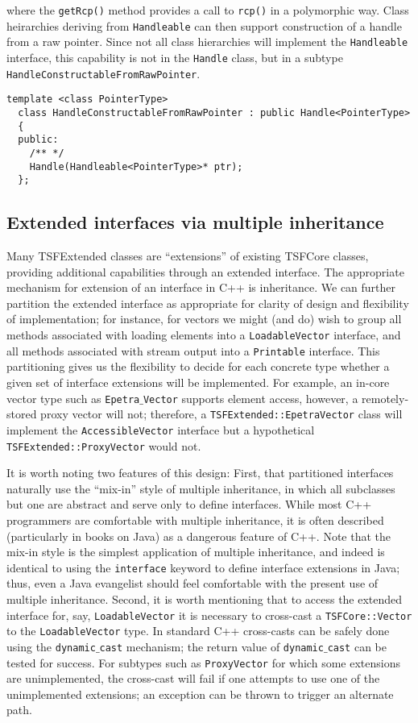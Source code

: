 where the {\tt getRcp()} method provides a call to {\tt rcp()} in 
a polymorphic way. Class heirarchies deriving from {\tt Handleable}
can then support construction of a handle from a raw pointer. Since
not all class hierarchies will implement the {\tt Handleable} interface,
this capability is not in the {\tt Handle} class, but in a subtype
{\tt HandleConstructableFromRawPointer}.
{\scriptsize\begin{verbatim}
template <class PointerType>
  class HandleConstructableFromRawPointer : public Handle<PointerType>
  {
  public:
    /** */
    Handle(Handleable<PointerType>* ptr);
  };
\end{verbatim}}


\subsection{Extended interfaces via multiple inheritance}

Many TSFExtended classes are ``extensions'' of existing TSFCore classes,
providing additional capabilities through an extended interface. 
The appropriate mechanism for extension of an interface in C++ is inheritance.
We can further partition the extended interface as appropriate for clarity
of design and flexibility of implementation; 
for instance, for vectors we might (and do) 
wish to group all methods associated with loading elements into 
a {\tt LoadableVector} interface, and all methods associated with
stream output into a {\tt Printable} interface. This partitioning gives
us the flexibility to decide for each concrete type whether a given
set of interface extensions will be implemented. For example, an in-core
vector type such as {\tt Epetra$\_$Vector} supports element access, however, 
a remotely-stored proxy vector will not; therefore, a 
{\tt TSFExtended::EpetraVector} class will implement the {\tt AccessibleVector}
interface but a hypothetical {\tt TSFExtended::ProxyVector} would not.

It is worth noting two features of this design: First, 
that partitioned interfaces naturally use the ``mix-in'' style 
of multiple inheritance, in which all subclasses but one are abstract and
serve only to define interfaces. While most C++ programmers are 
comfortable with multiple inheritance, it is often described (particularly
in books on Java) as a dangerous feature of C++. Note that the mix-in style
is the simplest application of multiple inheritance, and indeed is identical
to using the {\tt interface} keyword to define interface extensions
in Java; thus, even a Java evangelist should feel comfortable with the present
use of multiple inheritance.
Second, it is worth mentioning that to access the extended interface for, 
say, {\tt LoadableVector} it is necessary to cross-cast 
a {\tt TSFCore::Vector} to the {\tt LoadableVector} type. In standard C++
cross-casts can be safely done using the {\tt dynamic$\_$cast} mechanism; the
return value of {\tt dynamic$\_$cast} can be tested for success. 
For subtypes such as {\tt ProxyVector} for which some extensions
are unimplemented, the cross-cast will fail if one attempts to use
one of the unimplemented extensions; an exception can be thrown to trigger
an alternate path.

